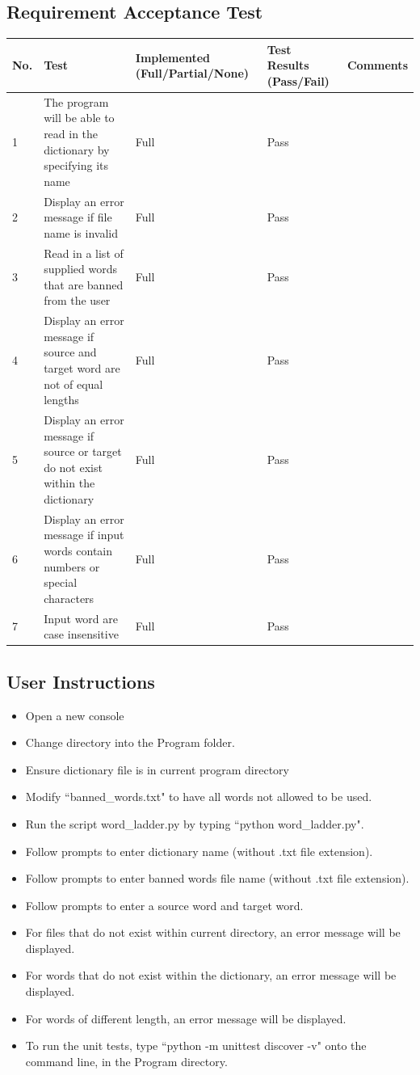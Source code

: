 \documentclass[12pt, a4]{report}
\begin{document}
	\subsection{Requirement Acceptance Test}
	
		\begin{tabular}{ |p{0.5cm}|p{7.25cm}|p{2.5cm}|p{2.5cm}|p{2cm}| }
			\hline
			No. & Test & Implemented (Full/Partial/None) & Test Results (Pass/Fail) & Comments \\
			\hline
			1 & The program will be able to read in the dictionary by specifying its name & Full & Pass &  \\
			2 & Display an error message if file name is invalid & Full & Pass  & \\
			3 & Read in a list of supplied words that are banned from the user & Full & Pass & \\
			4 & Display an error message if source and target word are not of equal lengths & Full & Pass & \\
			5 & Display an error message if source or target do not exist within the dictionary & Full & Pass & \\
			6 & Display an error message if input words contain numbers or special characters & Full & Pass & \\
			7 & Input word are case insensitive & Full & Pass & \\
			\hline
		\end{tabular}
	
	\newpage
	\subsection{User Instructions}
		\begin{itemize}
			\item Open a new console 
			\item Change directory into the Program folder.
			\item Ensure dictionary file is in current program directory
			\item Modify ``banned\_words.txt" to have all words not allowed to be used.  
			\item Run the script word\_ladder.py by typing ``python word\_ladder.py".
			\item Follow prompts to enter dictionary name (without .txt file extension).
			\item Follow prompts to enter banned words file name (without .txt file extension).
			\item Follow prompts to enter a source word and target word.
			\item For files that do not exist within current directory, an error message will be displayed.
			\item For words that do not exist within the dictionary, an error message will be displayed. 
			\item For words of different length, an error message will be displayed. 
			\item To run the unit tests, type ``python -m unittest discover -v" onto the command line, in the Program directory. 
		\end{itemize}


	
\end{document}
